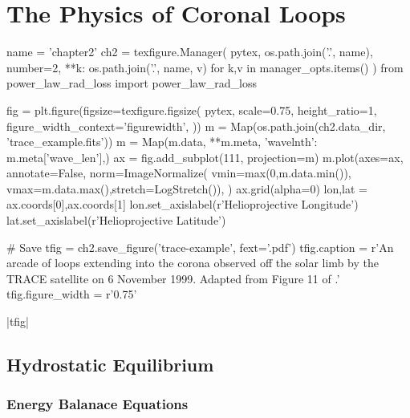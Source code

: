 \chapter{The Physics of Coronal Loops}\label{ch:loops}

\begin{pycode}[chapter2]
name = 'chapter2'
ch2 = texfigure.Manager(
    pytex,
    os.path.join('.', name),
    number=2,
    **{k: os.path.join('.', name, v) for k,v in manager_opts.items()}
)
from power_law_rad_loss import power_law_rad_loss
\end{pycode}


\begin{pycode}[chapter2]
fig = plt.figure(figsize=texfigure.figsize(
    pytex,
    scale=0.75,
    height_ratio=1,
    figure_width_context='figurewidth',
))
m = Map(os.path.join(ch2.data_dir, 'trace_example.fits'))
m = Map(m.data, {**m.meta, 'wavelnth': m.meta['wave_len']},)
ax = fig.add_subplot(111, projection=m)
m.plot(axes=ax,
       annotate=False,
       norm=ImageNormalize(
           vmin=max(0,m.data.min()),
           vmax=m.data.max(),stretch=LogStretch()),
)
ax.grid(alpha=0)
lon,lat = ax.coords[0],ax.coords[1]
lon.set_axislabel(r'Helioprojective Longitude')
lat.set_axislabel(r'Helioprojective Latitude')

# Save
tfig = ch2.save_figure('trace-example', fext='.pdf')
tfig.caption = r'An arcade of loops extending into the corona observed off the solar limb by the TRACE satellite on 6 November 1999. Adapted from Figure 11 of \citet{reale_coronal_2010}.'
tfig.figure_width = r'0.75\textwidth'
\end{pycode}
\py[chapter2]|tfig|

\section{Hydrostatic Equilibrium}\label{sec:hydrostatic}

\subsection{Energy Balanace Equations}\label{sec:hydrostatic_equations}

